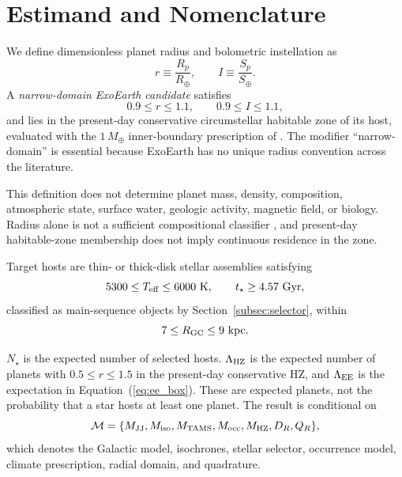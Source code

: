 \documentclass[twocolumn,linenumbers]{aastex702}
\newcommand{\Rearth}{R_{\oplus}}
\newcommand{\Mearth}{M_{\oplus}}
\newcommand{\Searth}{S_{\oplus}}
\newcommand{\Teff}{T_{\rm eff}}
\newcommand{\Rgc}{R_{\rm GC}}
\newcommand{\LamEE}{\Lambda_{\rm EE}}
\newcommand{\LamHZ}{\Lambda_{\rm HZ}}
\begin{document}
\section{Estimand and Nomenclature}\label{sec:estimand}

We define dimensionless planet radius and bolometric instellation as
\begin{equation}
 r\equiv\frac{R_p}{\Rearth},
 \qquad
 I\equiv\frac{S_p}{\Searth}.
 \label{eq:variables}
\end{equation}
A \emph{narrow-domain ExoEarth candidate} satisfies
\begin{equation}
 0.9\leq r\leq1.1,
 \qquad
 0.9\leq I\leq1.1,
 \label{eq:ee_box}
\end{equation}
and lies in the present-day conservative circumstellar habitable zone of its
host, evaluated with the $1\,\Mearth$ inner-boundary prescription of
\citet{Kopparapu2013,Kopparapu2013Erratum,Kopparapu2014}. The modifier ``narrow-domain'' is
essential because ExoEarth has no unique radius convention across the
literature.

This definition does not determine planet mass, density, composition,
atmospheric state, surface water, geologic activity, magnetic field, or
biology. Radius alone is not a sufficient compositional classifier
\citep{Rogers2015}, and present-day habitable-zone membership does not imply
continuous residence in the zone.

Target hosts are thin- or thick-disk stellar assemblies satisfying
\begin{equation}
 5300\leq\Teff\leq6000\ {\rm K},
 \qquad
 t_\star\geq4.57\ {\rm Gyr},
 \label{eq:host_window}
\end{equation}
classified as main-sequence objects by Section~\ref{subsec:selector}, within
\begin{equation}
 7\leq\Rgc\leq9\ {\rm kpc}.
 \label{eq:annulus}
\end{equation}

$N_\star$ is the expected number of selected hosts. $\LamHZ$ is the expected
number of planets with $0.5\leq r\leq1.5$ in the present-day conservative HZ,
and $\LamEE$ is the expectation in Equation~(\ref{eq:ee_box}). These are
expected planets, not the probability that a star hosts at least one planet.
The result is conditional on
\begin{equation}
 \mathcal{M}=\{M_{\rm JJ},M_{\rm iso},M_{\rm TAMS},
 M_{\rm occ},M_{\rm HZ},D_R,Q_R\},
 \label{eq:model_stack}
\end{equation}
which denotes the Galactic model, isochrones, stellar selector, occurrence
model, climate prescription, radial domain, and quadrature.









\end{document}
